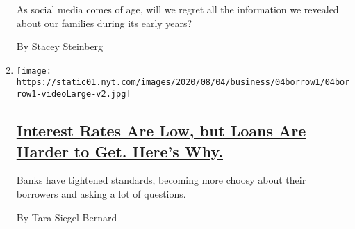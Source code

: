 \begin{enumerate}
  As social media comes of age, will we regret all the information we
  revealed about our families during its early years?

  By Stacey Steinberg
\item
  \texttt{[image: https://static01.nyt.com/images/2020/08/04/business/04borrow1/04borrow1-videoLarge-v2.jpg]}

  \hypertarget{interest-rates-are-low-but-loans-are-harder-to-get-heres-why}{%
  \subsection{\texorpdfstring{\href{/2020/08/04/your-money/mortgage-loans-credit-cards-coronavirus.html}{Interest
  Rates Are Low, but Loans Are Harder to Get. Here's
  Why.}}{Interest Rates Are Low, but Loans Are Harder to Get. Here's Why.}}\label{interest-rates-are-low-but-loans-are-harder-to-get-heres-why}}

  Banks have tightened standards, becoming more choosy about their
  borrowers and asking a lot of questions.

  By Tara Siegel Bernard
\end{enumerate}

